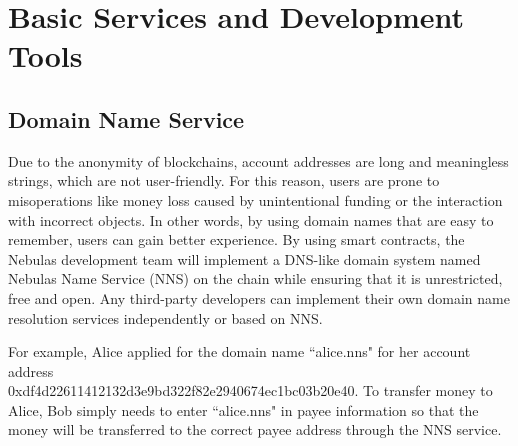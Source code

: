 \section{Basic Services and Development Tools}
\label{sec:tools}

\subsection{Domain Name Service}

Due to the anonymity of blockchains, account addresses are long and meaningless strings, which are not user-friendly. For this reason, users are prone to misoperations like money loss caused by unintentional funding or the interaction with incorrect objects. In other words, by using domain names that are easy to remember, users can gain better experience. By using smart contracts, the Nebulas development team will implement a DNS-like domain system named Nebulas Name Service (NNS) on the chain while ensuring that it is unrestricted, free and open. Any third-party developers can implement their own domain name resolution services independently or based on NNS.


For example, Alice applied for the domain name ``alice.nns" for her account address \\0xdf4d22611412132d3e9bd322f82e2940674ec1bc03b20e40. To transfer money to Alice, Bob simply needs to enter ``alice.nns" in payee information so that the money will be transferred to the correct payee address through the NNS service.


